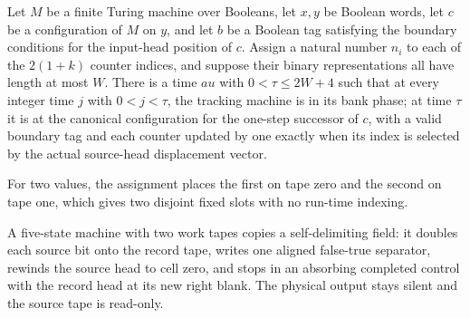 \begin{lemma}
\label{Complexity.clTrack_round}
\leanok
{}
Let $M$ be a finite Turing machine over Booleans, let $x,y$ be Boolean words, let $c$ be
a configuration of $M$ on $y$, and let $b$ be a Boolean tag satisfying the boundary
conditions for the input-head position of $c$. Assign a natural number $n_i$ to each of
the $2(1+k)$ counter indices, and suppose their binary representations all have length
at most $W$. There is a time $	au$ with $0<\tau\le 2W+4$ such that at every integer time
$j$ with $0<j<\tau$, the tracking machine is in its bank phase; at time $\tau$ it is at
the canonical configuration for the one-step successor of $c$, with a valid boundary tag
and each counter updated by one exactly when its index is selected by the actual
source-head displacement vector.
\end{lemma}

\begin{definition}
\label{Complexity.clTwo}
\leanok
For two values, the assignment places the first on tape zero and the second on tape one, which gives two disjoint fixed slots with no run-time indexing.
\end{definition}

\begin{definition}
\label{Complexity.clCopyTM}
\leanok
{}
A five-state machine with two work tapes copies a self-delimiting field: it doubles each source bit onto the record tape, writes one aligned false-true separator, rewinds the source head to cell zero, and stops in an absorbing completed control with the record head at its new right blank. The physical output stays silent and the source tape is read-only.
\end{definition}

